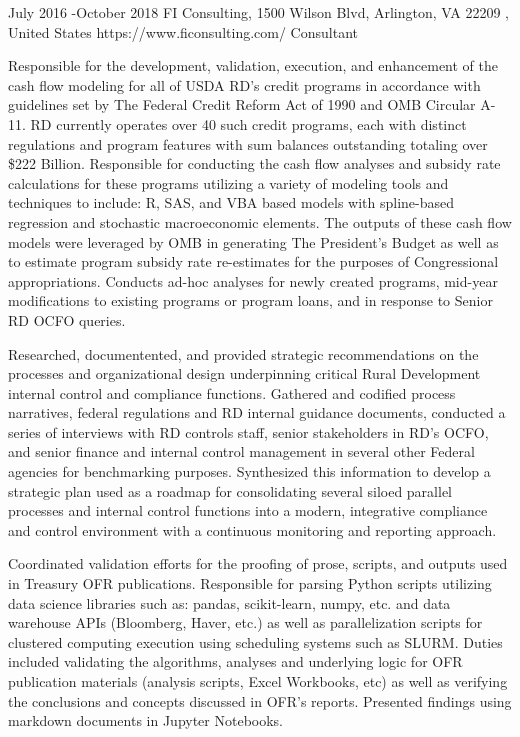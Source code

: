 \documentclass[10pt]{article} %
\begin{document}
\job
{July 2016 -}{October 2018}
{FI Consulting, 1500 Wilson Blvd, Arlington, VA 22209 , United States}
{https://www.ficonsulting.com/}
{Consultant}
{Responsible for the development, validation, execution, and enhancement of the cash flow modeling for all of USDA RD’s credit programs in accordance with guidelines set by The Federal Credit Reform Act of 1990 and OMB Circular A-11. RD currently operates over 40 such credit programs, each with distinct regulations and program features with sum balances outstanding totaling over \$222 Billion. Responsible for conducting the cash flow analyses and subsidy rate calculations for these programs utilizing a variety of modeling tools and techniques to include:  R, SAS, and VBA based models with spline-based regression and stochastic macroeconomic elements. The outputs of these cash flow models were leveraged by OMB in generating The President’s Budget as well as to estimate program subsidy rate re-estimates for the purposes of Congressional appropriations. Conducts ad-hoc analyses for newly created programs, mid-year modifications to existing programs or program loans, and in response to Senior RD OCFO queries.

Researched, documentented, and provided strategic recommendations on the processes and organizational design underpinning critical Rural Development internal control and compliance functions. Gathered and codified process narratives, federal regulations and RD internal guidance documents, conducted a series of interviews with RD controls staff, senior stakeholders in RD’s OCFO, and senior finance and internal control management in several other Federal agencies for benchmarking purposes. Synthesized this information to develop a strategic plan used as a roadmap for consolidating several siloed parallel processes and internal control functions into a modern, integrative compliance and control environment with a continuous monitoring and reporting approach.

Coordinated validation efforts for the proofing of prose, scripts, and outputs used in Treasury OFR publications. Responsible for parsing Python scripts utilizing data science libraries such as: pandas, scikit-learn, numpy, etc. and data warehouse APIs (Bloomberg, Haver, etc.) as well as parallelization scripts for clustered computing execution using scheduling systems such as SLURM. Duties included validating the algorithms, analyses and underlying logic for OFR publication materials (analysis scripts, Excel Workbooks, etc) as well as verifying the conclusions and concepts discussed in OFR’s reports. Presented findings using markdown documents in Jupyter Notebooks.

}
\end{document}
